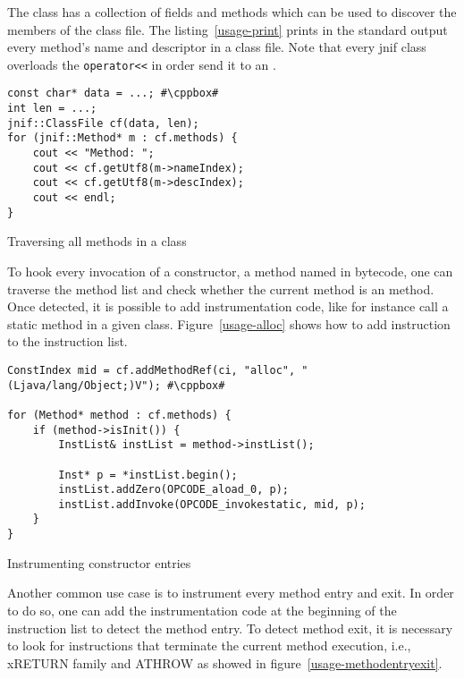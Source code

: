The  class has a collection of fields and methods which can be used to discover the members of the class file. 
The listing~\ref{usage-print} prints in the standard output every method's name and descriptor in a class file. 
Note that every jnif class overloads the \verb|operator<<| in order send it to an .

\begin{listing}
\begin{verbatim}
const char* data = ...; #\cppbox#
int len = ...;
jnif::ClassFile cf(data, len);
for (jnif::Method* m : cf.methods) {
	cout << "Method: ";
	cout << cf.getUtf8(m->nameIndex);
	cout << cf.getUtf8(m->descIndex);
	cout << endl;
}
\end{verbatim}
\caption{Traversing all methods in a class}
\label{usage-print}
\end{listing}

To hook every invocation of a constructor, a method named  in \java{} bytecode, 
one can traverse the method list and check whether the current method is an  method. 
Once detected, it is possible to add instrumentation code, like for instance call a static method in a given class. 
Figure~\ref{usage-alloc} shows how to add instruction to the instruction list.

\begin{listing}
\begin{verbatim}
ConstIndex mid = cf.addMethodRef(ci, "alloc", "(Ljava/lang/Object;)V"); #\cppbox#

for (Method* method : cf.methods) {
	if (method->isInit()) {
		InstList& instList = method->instList();

		Inst* p = *instList.begin();
		instList.addZero(OPCODE_aload_0, p);
		instList.addInvoke(OPCODE_invokestatic, mid, p);
	}
}
\end{verbatim}
\caption{Instrumenting constructor entries}
\label{usage-alloc}
\end{listing}

Another common use case is to instrument every method entry and exit. In order to do so, one can add the instrumentation code at the beginning of the instruction list to detect the method entry. To detect method exit, it is necessary to look for instructions that terminate the current method execution, i.e., xRETURN family and ATHROW as showed in figure~\ref{usage-methodentryexit}.

